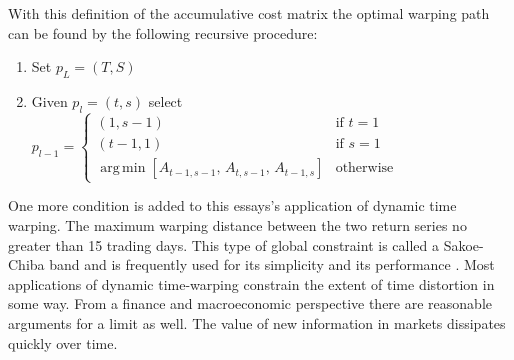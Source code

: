 \documentclass[12pt]{report}
\DeclareMathOperator*{\argmin}{arg\,min}
\begin{document}
With this definition of the accumulative cost matrix the optimal warping path can be found by the following recursive procedure:

\begin{enumerate}
    \item Set $p_{L} = (T, S)$
    \item Given $p_{l} = (t, s)$ select $p_{l - 1} = \begin{cases} (1, s-1) & \textrm{if } t=1 \\ (t-1,1) & \textrm{if } s=1 \\ 
                                            \argmin \left[ A_{t-1, s-1},\, A_{t, s-1},\, A_{t-1, s} \right] & \textrm{otherwise} \end{cases}$
\end{enumerate}

One more condition is added to this essays's application of dynamic time warping. The maximum warping distance between the two return series no greater than 15 trading days. This type of global constraint is called a Sakoe-Chiba band \parencite{SakoeChiba_IEEE_1978} and is frequently used for its simplicity and its performance \parencite{geler2019dynamic}. Most applications of dynamic time-warping constrain the extent of time distortion in some way. From a finance and macroeconomic perspective there are reasonable arguments for a limit as well. The value of new information in markets dissipates quickly over time.

%
\end{document}
